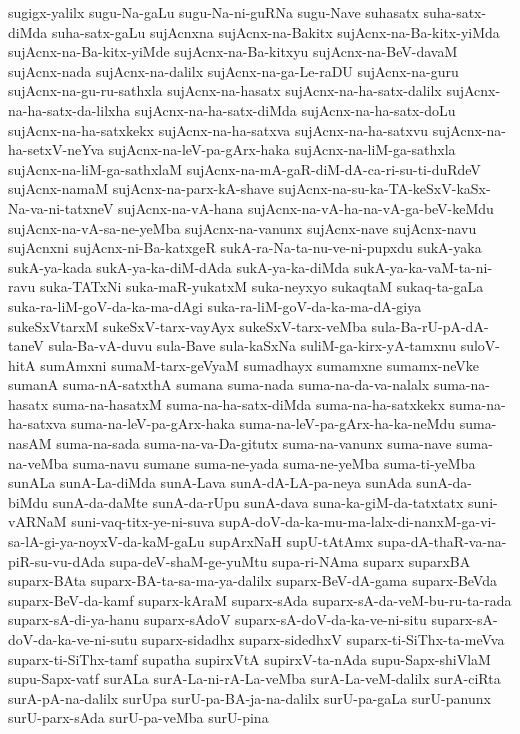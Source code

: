 {sugigx-yalilx
sugu-Na-gaLu
sugu-Na-ni-guRNa
sugu-Nave
suhasatx
suha-satx-diMda
suha-satx-gaLu
sujAcnxna
sujAcnx-na-Bakitx
sujAcnx-na-Ba-kitx-yiMda
sujAcnx-na-Ba-kitx-yiMde
sujAcnx-na-Ba-kitxyu
sujAcnx-na-BeV-davaM
sujAcnx-nada
sujAcnx-na-dalilx
sujAcnx-na-ga-Le-raDU
sujAcnx-na-guru
sujAcnx-na-gu-ru-sathxla
sujAcnx-na-hasatx
sujAcnx-na-ha-satx-dalilx
sujAcnx-na-ha-satx-da-lilxha
sujAcnx-na-ha-satx-diMda
sujAcnx-na-ha-satx-doLu
sujAcnx-na-ha-satxkekx
sujAcnx-na-ha-satxva
sujAcnx-na-ha-satxvu
sujAcnx-na-ha-setxV-neYva
sujAcnx-na-leV-pa-gArx-haka
sujAcnx-na-liM-ga-sathxla
sujAcnx-na-liM-ga-sathxlaM
sujAcnx-na-mA-gaR-diM-dA-ca-ri-su-ti-duRdeV
sujAcnx-namaM
sujAcnx-na-parx-kA-shave
sujAcnx-na-su-ka-TA-keSxV-kaSx-Na-va-ni-tatxneV
sujAcnx-na-vA-hana
sujAcnx-na-vA-ha-na-vA-ga-beV-keMdu
sujAcnx-na-vA-sa-ne-yeMba
sujAcnx-na-vanunx
sujAcnx-nave
sujAcnx-navu
sujAcnxni
sujAcnx-ni-Ba-katxgeR
sukA-ra-Na-ta-nu-ve-ni-pupxdu
sukA-yaka
sukA-ya-kada
sukA-ya-ka-diM-dAda
sukA-ya-ka-diMda
sukA-ya-ka-vaM-ta-ni-ravu
suka-TATxNi
suka-maR-yukatxM
suka-neyxyo
sukaqtaM
sukaq-ta-gaLa
suka-ra-liM-goV-da-ka-ma-dAgi
suka-ra-liM-goV-da-ka-ma-dA-giya
sukeSxVtarxM
sukeSxV-tarx-vayAyx
sukeSxV-tarx-veMba
sula-Ba-rU-pA-dA-taneV
sula-Ba-vA-duvu
sula-Bave
sula-kaSxNa
suliM-ga-kirx-yA-tamxnu
suloV-hitA
sumAmxni
sumaM-tarx-geVyaM
sumadhayx
sumamxne
sumamx-neVke
sumanA
suma-nA-satxthA
sumana
suma-nada
suma-na-da-va-nalalx
suma-na-hasatx
suma-na-hasatxM
suma-na-ha-satx-diMda
suma-na-ha-satxkekx
suma-na-ha-satxva
suma-na-leV-pa-gArx-haka
suma-na-leV-pa-gArx-ha-ka-neMdu
suma-nasAM
suma-na-sada
suma-na-va-Da-gitutx
suma-na-vanunx
suma-nave
suma-na-veMba
suma-navu
sumane
suma-ne-yada
suma-ne-yeMba
suma-ti-yeMba
sunALa
sunA-La-diMda
sunA-Lava
sunA-dA-LA-pa-neya
sunAda
sunA-da-biMdu
sunA-da-daMte
sunA-da-rUpu
sunA-dava
suna-ka-giM-da-tatxtatx
suni-vARNaM
suni-vaq-titx-ye-ni-suva
supA-doV-da-ka-mu-ma-lalx-di-nanxM-ga-vi-sa-lA-gi-ya-noyxV-da-kaM-gaLu
supArxNaH
supU-tAtAmx
supa-dA-thaR-va-na-piR-su-vu-dAda
supa-deV-shaM-ge-yuMtu
supa-ri-NAma
suparx
suparxBA
suparx-BAta
suparx-BA-ta-sa-ma-ya-dalilx
suparx-BeV-dA-gama
suparx-BeVda
suparx-BeV-da-kamf
suparx-kAraM
suparx-sAda
suparx-sA-da-veM-bu-ru-ta-rada
suparx-sA-di-ya-hanu
suparx-sAdoV
suparx-sA-doV-da-ka-ve-ni-situ
suparx-sA-doV-da-ka-ve-ni-sutu
suparx-sidadhx
suparx-sidedhxV
suparx-ti-SiThx-ta-meVva
suparx-ti-SiThx-tamf
supatha
supirxVtA
supirxV-ta-nAda
supu-Sapx-shiVlaM
supu-Sapx-vatf
surALa
surA-La-ni-rA-La-veMba
surA-La-veM-dalilx
surA-ciRta
surA-pA-na-dalilx
surUpa
surU-pa-BA-ja-na-dalilx
surU-pa-gaLa
surU-panunx
surU-parx-sAda
surU-pa-veMba
surU-pina
}
